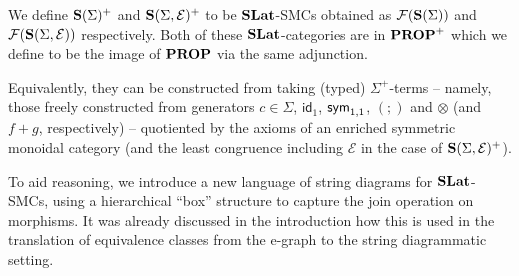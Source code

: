 \begin{definition}
We define $\mathbf{S}(\Sigma)^{+}$ and $\mathbf{S}(\Sigma, \mathcal{E})^{+}$ to be $\mathbf{SLat}$-SMCs obtained as $\mathcal{F}(\mathbf{S}(\Sigma))$ and $\mathcal{F}(\mathbf{S}(\Sigma, \mathcal{E}))$ respectively.
Both of these $\mathbf{SLat}$-categories are in $\mathbf{PROP}^{+}$ which we define to be the image of $\mathbf{PROP}$ via the same adjunction.
\end{definition}
Equivalently, they can be constructed from taking (typed) $\Sigma^+$-terms  -- namely, those freely constructed from generators $c \in \Sigma$, $\textsf{id}_1$, $\textsf{sym}_{1,1}$, $(;\!)$ and $\otimes$ (and $f+g$, respectively) -- quotiented by the axioms of an enriched symmetric monoidal category (and the least congruence including $\mathcal{E}$ in the case of $\mathbf{S}(\Sigma, \mathcal{E})^{+}$).

To aid reasoning, we introduce a new language of string diagrams for $\mathbf{SLat}$-SMCs, using a hierarchical ``box'' structure to capture the join operation on morphisms.  It was already discussed in the introduction how this is  used in the translation of equivalence classes from the e-graph to the string diagrammatic setting. 

